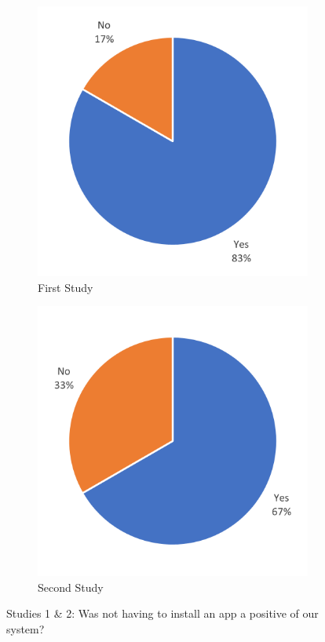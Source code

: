\documentclass[thesis]{fputhesis}
\begin{document}
\begin{body}
\begin{figure}[h]
    \centering
    \begin{subfigure}[]{.45\textwidth}
        \centering
        \includegraphics[width=\textwidth]{Images/web impact study 1.png}
        \caption{First Study}
    \end{subfigure}
    \begin{subfigure}[]{.45\textwidth}
        \centering
        \includegraphics[width=\textwidth]{Images/web impact study 2.png}
        \caption{Second Study}
    \end{subfigure}
    \caption{Studies 1 \& 2: Was not having to install an app a positive of our system?}
    \label{fig:no-download}
\end{figure}


\end{body}
\end{document}
